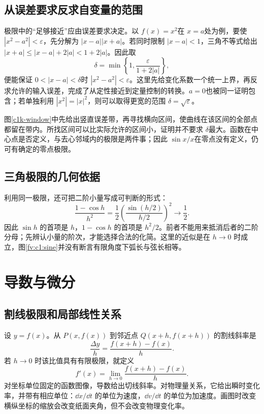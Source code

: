 \subsection{从误差要求反求自变量的范围}
极限中的“足够接近”应由误差要求决定。以 $f(x)=x^2$在 $x=a$处为例，要使 $|x^2-a^2|<\varepsilon$，先分解为 $|x-a||x+a|$。若同时限制 $|x-a|<1$，三角不等式给出 $|x+a|\le|x-a|+2|a|<1+2|a|$。因此取
\[\delta=\min\left\{1,\frac{\varepsilon}{1+2|a|}\right\},\]
便能保证 $0<|x-a|<\delta$时 $|x^2-a^2|<\varepsilon$。这里先给变化系数一个统一上界，再反求允许的输入误差，完成了从定性接近到定量控制的转换。$a=0$也被同一证明包含；若单独利用 $|x^2|=|x|^2$，则可以取得更宽的范围 $\delta=\sqrt\varepsilon$。

图\ref{c1k-window}中先给出竖直误差带，再寻找横向区间，使曲线在该区间的全部点都留在带内。所找区间可以比实际允许的区间小，证明并不要求 $\delta$最大。函数在中心点是否定义，与去心邻域内的极限是两件事；因此 $\sin x/x$在零点没有定义，仍可有确定的零点极限。

\subsection{三角极限的几何依据}

利用同一极限，还可把二阶小量写成可判断的形式：
\[
 \frac{1-\cos h}{h^2}
 =\frac12\left(\frac{\sin(h/2)}{h/2}\right)^2\longrightarrow\frac12.
\]
因此 $\sin h$ 的首项是 $h$，$1-\cos h$ 的首项是 $h^2/2$。前者不能用来抵消后者的二阶分母；先辨认小量的阶次，才能选择合法的化简。这里的近似是在 $h\to0$ 时成立，图\ref{fv:c1:sine}并没有断言有限角度下弧长与弦长相等。


\section{导数与微分}
\subsection{割线极限和局部线性关系}
设 $y=f(x)$。从 $P(x,f(x))$ 到邻近点 $Q(x+h,f(x+h))$ 的割线斜率是
\[
 \frac{\Delta y}{h}=\frac{f(x+h)-f(x)}h.
\]
若 $h\to0$ 时该比值具有有限极限，就定义
\[
 f'(x)=\lim_{h\to0}\frac{f(x+h)-f(x)}h.
\]
对坐标单位固定的函数图像，导数给出切线斜率。对物理量关系，它给出瞬时变化率，并带有相应单位：$\dd x/\dd t$ 的单位为速度，$\dd v/\dd t$ 的单位为加速度。画图时改变横纵坐标的缩放会改变纸面夹角，但不会改变物理变化率。


